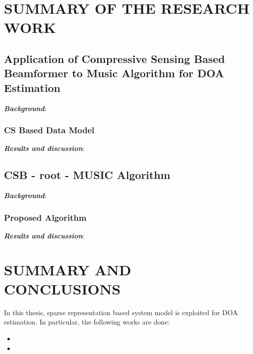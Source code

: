 \documentclass[12pt,a4paper]{article}
\theoremstyle{plain}
\theoremstyle{definition}
\begin{document}
\section{SUMMARY OF THE RESEARCH WORK}

\subsection{Application of Compressive Sensing Based Beamformer to Music Algorithm for DOA Estimation}
\textbf{\emph{Background}}: 
\subsubsection{CS Based Data Model}

\textbf{\emph{Results and discussion}}: 

\subsection{CSB - root - MUSIC Algorithm}
\textbf{\emph{Background}}: 

\subsubsection{Proposed Algorithm}

\textbf{\emph{Results and discussion}}: 


\section{SUMMARY AND CONCLUSIONS}
In this thesis, sparse representation based system model is exploited for DOA estimation. In particular, the following works are done:

\begin{itemize}

\item

\item  


\end{itemize}
\end{document}
